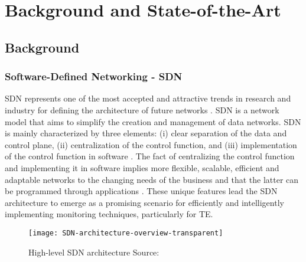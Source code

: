 \section{Background and State-of-the-Art}
\label{sec:state_of_the_art}

\subsection{Background}
\label{sub:background}

\subsubsection{Software-Defined Networking - SDN}
\label{subsub:background-sdn}

SDN represents one of the most accepted and attractive trends in research and industry for defining the architecture of future networks \cite{feamster_2014:road_sdn, lin_2011:survey_programmable_networks}. SDN is a network model that aims to simplify the creation and management of data networks. SDN is mainly characterized by three elements: (i) clear separation of the data and control plane, (ii) centralization of the control function, and (iii) implementation of the control function in software \cite{kreutz_2015:sdn_comprehensive_survey, nunes_2014:surve_sdn_ppf}. The fact of centralizing the control function and implementing it in software implies more flexible, scalable, efficient and adaptable networks to the changing needs of the business and that the latter can be programmed through applications \cite{herrera_2016:nfv_survey}. These unique features lead the SDN architecture to emerge as a promising scenario for efficiently and intelligently implementing monitoring techniques, particularly for TE.

\begin{figure}[!ht]
    \centering
    \texttt{[image: SDN-architecture-overview-transparent]}
    \caption{High-level SDN architecture Source: \cite{onf_2013:sdn_architecture_overview}}
    \label{fig:sdn_architecture}
\end{figure}

